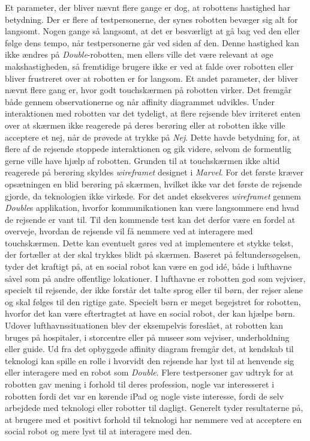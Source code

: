 Et parameter, der bliver nævnt flere gange er dog, at robottens hastighed har betydning. Der er flere af testpersonerne, der synes robotten bevæger sig alt for langsomt. Nogen gange så langsomt, at det er besværligt at gå bag ved den eller følge dens tempo, når testpersonerne går ved siden af den. Denne hastighed kan ikke ændres på \textit{Double}-robotten, men ellers ville det være relevant at øge makshastigheden, så fremtidige brugere ikke er ved at falde over robotten eller bliver frustreret over at robotten er for langsom.\blankline
%
Et andet parameter, der bliver nævnt flere gang er, hvor godt touchskærmen på robotten virker. Det fremgår både gennem observationerne og når affinity diagrammet udvikles. Under interaktionen med robotten var det tydeligt, at flere rejsende blev irriteret enten over at skærmen ikke reagerede på deres berøring eller at robotten ikke ville acceptere et nej, når de prøvede at trykke på \textit{Nej}. Dette havde betydning for, at flere af de rejsende stoppede interaktionen og gik videre, selvom de formentlig gerne ville have hjælp af robotten. Grunden til at touchskærmen ikke altid reagerede på berøring skyldes \textit{wireframet} designet i \textit{Marvel}. For det første kræver opsætningen en blid berøring på skærmen, hvilket ikke var det første de rejsende gjorde, da teknologien ikke virkede. For det andet eksekveres \textit{wireframet} gennem \textit{Double}s applikation, hvorfor kommunikationen kan være langsommere end hvad de rejsende er vant til. Til den kommende test kan det derfor være en fordel at overveje, hvordan de rejsende vil få nemmere ved at interagere med touchskærmen. Dette kan eventuelt gøres ved at implementere et stykke tekst, der fortæller at der skal trykkes blidt på skærmen.\blankline
%
Baseret på feltundersøgelsen, tyder det kraftigt på, at en social robot kan være en god idé, både i lufthavne såvel som på andre offentlige lokationer. I lufthavne er robotten god som vejviser, specielt til rejsende, der ikke forstår det talte sprog eller til børn, der rejser alene og skal følges til den rigtige gate. Specielt børn er meget begejstret for robotten, hvorfor det kan være eftertragtet at have en social robot, der kan hjælpe børn. Udover lufthavnssituationen blev der eksempelvis foreslået, at robotten kan bruges på hospitaler, i storcentre eller på museer som vejviser, underholdning eller guide. Ud fra det opbyggede affinity diagram fremgår det, at kendskab til teknologi kan spille en rolle i hvorvidt den rejsende har lyst til at henvende sig eller interagere med en robot som \textit{Double}. Flere testpersoner gav udtryk for at robotten gav mening i forhold til deres profession, nogle var interesseret i robotten fordi det var en kørende iPad og nogle viste interesse, fordi de selv arbejdede med teknologi eller robotter til dagligt. Generelt tyder resultaterne på, at brugere med et positivt forhold til teknologi har nemmere ved at acceptere en social robot og mere lyst til at interagere med den. 

